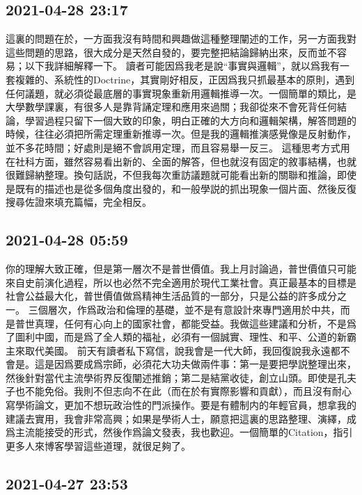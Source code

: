 \documentclass[twocolumn]{ctexart}
\begin{document}
\subsection*{2021-04-28 23:17}

這裏的問題在於，一方面我沒有時間和興趣做這種整理闡述的工作，另一方面我對這些問題的思路，很大成分是天然自發的，要完整把結論歸納出來，反而並不容易；以下我詳細解釋一下。
讀者可能因爲我老是說“事實與邏輯”，就以爲我有一套複雜的、系統性的Doctrine，其實剛好相反，正因爲我只抓最基本的原則，遇到任何議題，就必須從最底層的事實現象重新用邏輯推導一次。一個簡單的類比，是大學數學課裏，有很多人是靠背誦定理和應用來過關；我卻從來不會死背任何結論，學習過程只留下一個大致的印象，明白正確的大方向和邏輯架構，解答問題的時候，往往必須把所需定理重新推導一次。但是我的邏輯推演感覺像是反射動作，並不多花時間；好處則是絕不會誤用定理，而且容易舉一反三。
這種思考方式用在社科方面，雖然容易看出新的、全面的解答，但也就沒有固定的敘事結構，也就很難歸納整理。換句話説，不但我每次重訪議題就可能看出新的關聯和推論，即使是既有的描述也是從多個角度出發的，和一般學説的抓出現象一個片面、然後反復搜尋佐證來填充篇幅，完全相反。
\subsection*{2021-04-28 05:59}

你的理解大致正確，但是第一層次不是普世價值。我上月討論過，普世價值只可能來自史前演化過程，所以也必然不完全適用於現代工業社會。真正最基本的目標是社會公益最大化，普世價值做爲精神生活品質的一部分，只是公益的許多成分之一。
三個層次，作爲政治和倫理的基礎，並不是有意設計來專門適用於中共，而是普世真理，任何有心向上的國家社會，都能受益。我做這些建議和分析，不是爲了圖利中國，而是爲了全人類的福祉，必須有一個誠實、理性、和平、公道的新霸主來取代美國。
前天有讀者私下寫信，說我會是一代大師，我回復說我永遠都不會是。這是因爲要成爲宗師，必須花大功夫做兩件事：第一是要把學説整理出來，然後針對當代主流學術界反復闡述推銷；第二是結黨收徒，創立山頭。即使是孔夫子也不能免俗。我則不但志向不在此（而在於有實際影響和貢獻），而且沒有耐心寫學術論文，更加不想玩政治性的門派操作。要是有體制内的年輕官員，想拿我的建議去實用，我會非常高興；如果是學術人士，願意把這裏的思路整理、演繹，成爲主流能接受的形式，然後作爲論文發表，我也歡迎。一個簡單的Citation，指引更多人來博客學習這些道理，就很足夠了。
\subsection*{2021-04-27 23:53}
\end{document}
